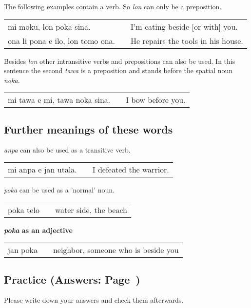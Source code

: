 The following examples contain a verb. 
So \textit{lon} can only be a preposition. 

\begin{supertabular}{p{5,5cm}|ll}
mi moku, lon poka sina.    && I'm eating beside [or with] you. \\
ona li pona e ilo, lon tomo ona. && He repairs the tools in his house. \\
\end{supertabular} 

Besides \textit{lon} other intransitive verbs and prepositions can also be used. 
In this sentence the second \textit{tawa} is a preposition and stands before the spatial noun \textit{noka}. 

\begin{supertabular}{p{5,5cm}|ll}
mi tawa e mi, tawa noka sina. && I bow before you. \\
\end{supertabular} 

%
\subsection*{Further meanings of these words}

\textit{anpa} can also be used as a transitive verb.

\begin{supertabular}{p{5,5cm}|ll}
mi anpa e jan utala. && I defeated the warrior. \\
\end{supertabular} 


\textit{poka} can be used as a 'normal' noun.

\begin{supertabular}{p{5,5cm}|ll}
poka telo && water side, the beach \\
\end{supertabular} 

\textbf{\textit{poka} as an adjective} \\
\begin{supertabular}{p{5,5cm}|ll}
jan poka && neighbor, someone who is beside you \\
\end{supertabular} 
%

%
\newpage
\subsection*{Practice (Answers: Page~\pageref{'other_prepositions'})}
%
Please write down your answers and check them afterwards. 










